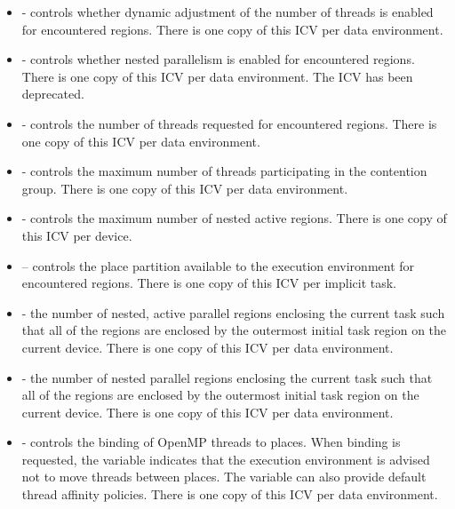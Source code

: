 \begin{itemize}
\item {} - controls whether dynamic adjustment of the number of threads is enabled
for encountered  regions. There is one copy of this ICV per data
environment.

\item {} - controls whether nested parallelism is enabled for encountered 
regions. There is one copy of this ICV per data environment. The  ICV has been deprecated.

\item {} - controls the number of threads requested for encountered 
regions. There is one copy of this ICV per data environment.

\item {} - controls the maximum number of threads participating in the
contention group. There is one copy of this ICV per data environment.

\item {} - controls the maximum number of nested active 
regions. There is one copy of this ICV per device.

\item {} -- controls the place partition available to the execution
environment for encountered  regions. There is one copy of this ICV per
implicit task.

\item {} - the number of nested, active parallel regions enclosing the current
task such that all of the  regions are enclosed by the outermost initial task
region on the current device. There is one copy of this ICV per data environment.

\item {} - the number of nested parallel regions enclosing the current task such that
all of the  regions are enclosed by the outermost initial task region on the
current device. There is one copy of this ICV per data environment.

\item {} - controls the binding of OpenMP threads to places. When binding is
requested, the variable indicates that the execution environment is advised not to
move threads between places. The variable can also provide default thread affinity
policies. There is one copy of this ICV per data environment.
\end{itemize}

